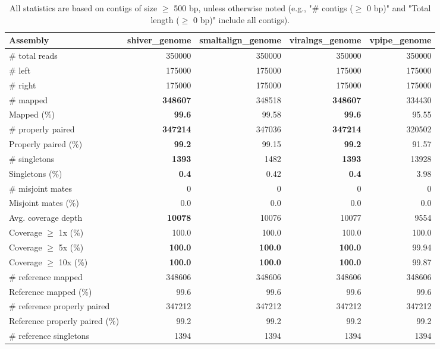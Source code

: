 \documentclass[12pt,a4paper]{article}
\begin{document}
\begin{table}[ht]
\begin{center}
\caption{All statistics are based on contigs of size $\geq$ 500 bp, unless otherwise noted (e.g., "\# contigs ($\geq$ 0 bp)" and "Total length ($\geq$ 0 bp)" include all contigs).}
\begin{tabular}{|l*{4}{|r}|}
\hline
Assembly & shiver\_genome & smaltalign\_genome & viralngs\_genome & vpipe\_genome \\ \hline
\# total reads & 350000 & 350000 & 350000 & 350000 \\ \hline
\# left & 175000 & 175000 & 175000 & 175000 \\ \hline
\# right & 175000 & 175000 & 175000 & 175000 \\ \hline
\# mapped & {\bf 348607} & 348518 & {\bf 348607} & 334430 \\ \hline
Mapped (\%) & {\bf 99.6} & 99.58 & {\bf 99.6} & 95.55 \\ \hline
\# properly paired & {\bf 347214} & 347036 & {\bf 347214} & 320502 \\ \hline
Properly paired (\%) & {\bf 99.2} & 99.15 & {\bf 99.2} & 91.57 \\ \hline
\# singletons & {\bf 1393} & 1482 & {\bf 1393} & 13928 \\ \hline
Singletons (\%) & {\bf 0.4} & 0.42 & {\bf 0.4} & 3.98 \\ \hline
\# misjoint mates & 0 & 0 & 0 & 0 \\ \hline
Misjoint mates (\%) & 0.0 & 0.0 & 0.0 & 0.0 \\ \hline
Avg. coverage depth & {\bf 10078} & 10076 & 10077 & 9554 \\ \hline
Coverage $\geq$ 1x (\%) & 100.0 & 100.0 & 100.0 & 100.0 \\ \hline
Coverage $\geq$ 5x (\%) & {\bf 100.0} & {\bf 100.0} & {\bf 100.0} & 99.94 \\ \hline
Coverage $\geq$ 10x (\%) & {\bf 100.0} & {\bf 100.0} & {\bf 100.0} & 99.87 \\ \hline
\# reference mapped & 348606 & 348606 & 348606 & 348606 \\ \hline
Reference mapped (\%) & 99.6 & 99.6 & 99.6 & 99.6 \\ \hline
\# reference properly paired & 347212 & 347212 & 347212 & 347212 \\ \hline
Reference properly paired (\%) & 99.2 & 99.2 & 99.2 & 99.2 \\ \hline
\# reference singletons & 1394 & 1394 & 1394 & 1394 \\ \hline

\end{tabular}
\end{center}
\end{table}
\end{document}

